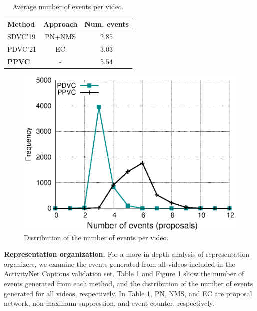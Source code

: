 \begin{table}[t]
  \centering
  \caption{
    Average number of events per video.
  }
  \begin{tabular}{l|c|c}
    \hline
    Method & Approach & Num. events \\
    \hline
    SDVC'19 \cite{mun2019streamlined} & PN+NMS & 2.85 \\
    PDVC'21 \cite{wang2021end} & EC & 3.03\\
    \textbf{PPVC} & - & 5.54 \\
    \hline
  \end{tabular}
  \label{tab:eval_num_events}
\end{table}

\begin{figure}[t]
  \centering
   \includegraphics[width=0.9\linewidth]{figures/ppvc_fig3}
   \caption{
    Distribution of the number of events per video.
   }
   \label{fig:eval_dist_events}
\end{figure}

\textbf{Representation organization.}
For a more in-depth analysis of representation organizers, we examine the events generated from all videos included in the ActivityNet Captions validation set.
Table \ref{tab:eval_num_events} and Figure \ref{fig:eval_dist_events} show the number of events generated from each method, and the distribution of the number of events generated for all videos, respectively.
In Table {\ref{tab:eval_num_events}}, PN, NMS, and EC are proposal network, non-maximum suppression, and event counter, respectively.

